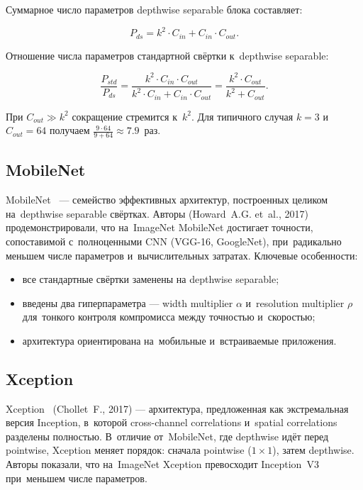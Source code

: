 Суммарное число параметров depthwise separable блока составляет:

\begin{equation}
    P_{ds} = k^2 \cdot C_{in} + C_{in} \cdot C_{out}.
    \label{eq:params_ds}
\end{equation}

Отношение числа параметров стандартной свёртки к~depthwise separable:

\begin{equation}
    \frac{P_{std}}{P_{ds}} = \frac{k^2 \cdot C_{in} \cdot C_{out}}{k^2 \cdot C_{in} + C_{in} \cdot C_{out}}
        = \frac{k^2 \cdot C_{out}}{k^2 + C_{out}}.
    \label{eq:ratio}
\end{equation}

При $C_{out} \gg k^2$ сокращение стремится к~$k^2$. Для типичного случая $k=3$ и~$C_{out}=64$ получаем $\frac{9\cdot64}{9+64} \approx 7.9$~раз.

\subsection{MobileNet}

MobileNet~\cite{mobilenet} — семейство эффективных архитектур, построенных целиком на~depthwise separable свёртках. Авторы (Howard~A.G. et~al., 2017) продемонстрировали, что на~ImageNet MobileNet достигает точности, сопоставимой с~полноценными CNN (VGG-16, GoogleNet), при~радикально меньшем числе параметров и~вычислительных затратах. Ключевые особенности:

\begin{itemize}
    \item все стандартные свёртки заменены на depthwise separable;
    \item введены два гиперпараметра — width multiplier $\alpha$ и~resolution multiplier $\rho$ для~тонкого контроля компромисса между точностью и~скоростью;
    \item архитектура ориентирована на~мобильные и~встраиваемые приложения.
\end{itemize}

\subsection{Xception}

Xception~\cite{xception} (Chollet~F., 2017) — архитектура, предложенная как экстремальная версия Inception, в~которой cross-channel correlations и~spatial correlations разделены полностью. В~отличие от~MobileNet, где depthwise идёт перед pointwise, Xception меняет порядок: сначала pointwise ($1\times1$), затем depthwise. Авторы показали, что на~ImageNet Xception превосходит Inception~V3 при~меньшем числе параметров.

